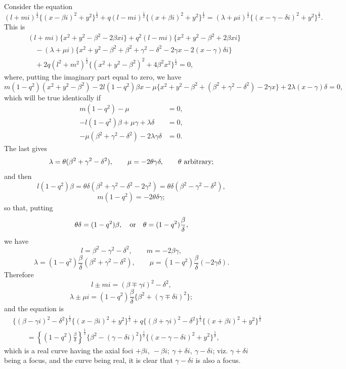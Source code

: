 \documentclass[10pt,twoside]{article}
\begin{document}
Consider the equation
\[
(l+mi)^{\frac12}\{(x-\beta i)^2+y^2\}^{\frac12}
+q(l-mi)^{\frac12}\{(x+\beta i)^2+y^2\}^{\frac12}
=(\lambda+\mu i)^{\frac12}\{(x-\gamma-\delta i)^2+y^2\}^{\frac12}.
\]
This is
\[
\begin{aligned}
&(l+mi)\{x^2+y^2-\beta^2-2\beta xi\}
 +q^2(l-mi)\{x^2+y^2-\beta^2+2\beta xi\}\\
&\quad-(\lambda+\mu i)\{x^2+y^2-\beta^2+\beta^2+\gamma^2-\delta^2
       -2\gamma x-2(x-\gamma)\delta i\}\\
&\quad+2q(l^2+m^2)^{\frac12}\{(x^2+y^2-\beta^2)^2+4\beta^2x^2\}^{\frac12}=0,
\end{aligned}
\]
where, putting the imaginary part equal to zero, we have
\[
m(1-q^2)(x^2+y^2-\beta^2)-2l(1-q^2)\beta x
-\mu\{x^2+y^2-\beta^2+(\beta^2+\gamma^2-\delta^2)-2\gamma x\}
+2\lambda(x-\gamma)\delta=0,
\]
which will be true identically if
\[
\begin{aligned}
m(1-q^2)-\mu&=0,\\
-l(1-q^2)\beta+\mu\gamma+\lambda\delta&=0,\\
-\mu(\beta^2+\gamma^2-\delta^2)-2\lambda\gamma\delta&=0.
\end{aligned}
\]
The last gives
\[
        \lambda=\theta(\beta^2+\gamma^2-\delta^2),\qquad
        \mu=-2\theta\gamma\delta,\qquad \theta\hbox{ arbitrary};
\]
and then
\[
l(1-q^2)\beta=\theta\delta(\beta^2+\gamma^2-\delta^2-2\gamma^2)
 =\theta\delta(\beta^2-\gamma^2-\delta^2),
\]
\[
        m(1-q^2)=-2\theta\delta\gamma;
\]
so that, putting
\[
        \theta\delta=(1-q^2)\beta,\quad\hbox{or}\quad
        \theta=(1-q^2)\frac{\beta}{\delta},
\]
we have
\[
l=\beta^2-\gamma^2-\delta^2,\qquad m=-2\beta\gamma,
\]
\[
\lambda=(1-q^2)\frac{\beta}{\delta}(\beta^2+\gamma^2-\delta^2),\qquad
\mu=(1-q^2)\frac{\beta}{\delta}(-2\gamma\delta).
\]
Therefore
\[
        l\pm mi=(\beta\mp\gamma i)^2-\delta^2,
\]
\[
        \lambda\pm\mu i=(1-q^2)\frac{\beta}{\delta}
        \{\beta^2+(\gamma\mp\delta i)^2\};
\]
and the equation is
\[
\begin{aligned}
&\{(\beta-\gamma i)^2-\delta^2\}^{\frac12}
  \{(x-\beta i)^2+y^2\}^{\frac12}
 +q\{(\beta+\gamma i)^2-\delta^2\}^{\frac12}
  \{(x+\beta i)^2+y^2\}^{\frac12}\\
&\qquad=
\left\{(1-q^2)\frac{\beta}{\delta}\right\}^{\frac12}
\{\beta^2-(\gamma-\delta i)^2\}^{\frac12}
\{(x-\gamma-\delta i)^2+y^2\}^{\frac12},
\end{aligned}
\]
which is a real curve having the axial foci \(+\beta i,\ -\beta i;\ \gamma+\delta i,\ \gamma-\delta i\);
viz. \(\gamma+\delta i\) being a focus, and the curve being real, it is clear
that \(\gamma-\delta i\) is also a focus.
\end{document}
